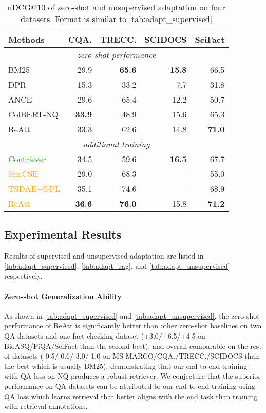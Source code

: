 \documentclass[11pt, dvipsnames]{article}
\def\middlecol{\hskip 6pt}
\newcommand{\ours}{ReAtt\xspace}
\newcommand{\msm}{MS MARCO\xspace}
\newcommand{\improve}[1]{}
\newcommand{\hlrow}{\rowcolor{LightCyan!50}}
\newcommand{\pretrain}[1]{\textcolor{Green}{#1}}
\newcommand{\adaptation}[1]{\textcolor{Orange}{#1}}
\begin{document}
\begin{table}[tb]
\centering
\small
\begin{tabular}{l@{\middlecol}r@{\middlecol}r@{\middlecol}r@{\middlecol}r}
\toprule
\textbf{Methods} & \textbf{CQA.} & \textbf{TRECC.} & \textbf{SCIDOCS} & \textbf{SciFact} \\
\midrule
\multicolumn{5}{c}{\emph{zero-shot performance}} \\
BM25 & 29.9 & \textbf{65.6} & \textbf{15.8} & 66.5 \\
DPR & 15.3 & 33.2 & 7.7 & 31.8 \\
ANCE & 29.6 & 65.4 & 12.2 & 50.7 \\
\hlrow ColBERT-NQ & \textbf{33.9} & 48.9 & 15.6 & 65.3 \\
\ours & 33.3 & 62.6 & 14.8 & \textbf{71.0} \\
\midrule
\multicolumn{5}{c}{\emph{additional training}} \\
\pretrain{Contriever} & 34.5 & 59.6 & \textbf{16.5} & 67.7 \\
\hlrow \adaptation{SimCSE} & 29.0 & 68.3 & - & 55.0 \\
\hlrow \adaptation{TSDAE+GPL} & 35.1 & 74.6 & - & 68.9 \\
\adaptation{\ours} & \improve{3.3}\textbf{36.6} & \improve{13.4}\textbf{76.0} & \improve{1.0}15.8 & \improve{0.2}\textbf{71.2} \\
\bottomrule
\end{tabular}
\caption{nDCG@10 of zero-shot and unsupervised adaptation on four datasets. Format is similar to \autoref{tab:adapt_supervised}}
\label{tab:adapt_unsupervised}
\end{table}

\subsection{Experimental Results}
Results of supervised and unsupervised adaptation are listed in \autoref{tab:adapt_supervised}, \autoref{tab:adapt_rag}, and \autoref{tab:adapt_unsupervised} respectively.

\paragraph{Zero-shot Generalization Ability}
As shown in \autoref{tab:adapt_supervised} and \autoref{tab:adapt_unsupervised}, the zero-shot performance of \ours is significantly better than other zero-shot baselines on two QA datasets and one fact checking dataset (+3.0/+6.5/+4.5 on BioASQ/FiQA/SciFact than the second best), and overall comparable on the rest of datasets (-0.5/-0.6/-3.0/-1.0 on \msm/CQA./TRECC./SCIDOCS than the best which is usually BM25), demonstrating that our end-to-end training with QA loss on NQ produces a robust retriever.
We conjecture that the superior performance on QA datasets can be attributed to our end-to-end training using QA loss which learns retrieval that better aligns with the end task than training with retrieval annotations.
\end{document}
